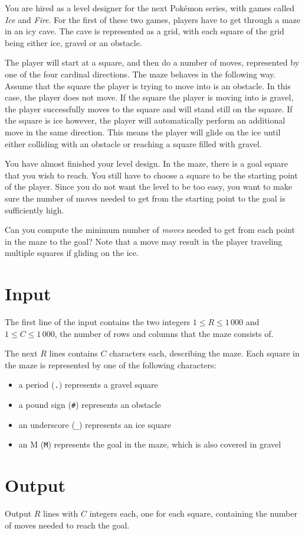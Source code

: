 You are hired as a level designer for the next Pokémon series, with games called \emph{Ice} and \emph{Fire}.
For the first of these two games, players have to get through a maze in an icy cave.
The cave is represented as a grid, with each square of the grid being either ice, gravel or an obstacle.

The player will start at a square, and then do a number of moves, represented by one of the four cardinal directions.
The maze behaves in the following way.
Assume that the square the player is trying to move into is an obstacle.
In this case, the player does not move.
If the square the player is moving into is gravel, the player successfully moves to the square and will stand still on the square.
If the square is ice however, the player will automatically perform an additional move in the same direction.
This means the player will glide on the ice until either colliding with an obstacle or reaching a square filled with gravel.

You have almost finished your level design.
In the maze, there is a goal square that you wish to reach.
You still have to choose a square to be the starting point of the player.
Since you do not want the level to be too easy, you want to make sure the number of moves needed to get from the starting point to the goal is sufficiently high.

Can you compute the minimum number of \emph{moves} needed to get from each point in the maze to the goal?
Note that a move may result in the player traveling multiple squares if gliding on the ice.

\section*{Input}
The first line of the input contains the two integers $1 \le R \le 1\,000$ and $1 \le C \le 1\,000$, the number of rows and columns that the maze consists of.

The next $R$ lines contains $C$ characters each, describing the maze.
Each square in the maze is represented by one of the following characters:
\begin{itemize}
\item a period (\texttt{.}) represents a gravel square
\item a pound sign (\texttt{\#}) represents an obstacle
\item an underscore (\texttt{\_}) represents an ice square
\item an M (\texttt{M}) represents the goal in the maze, which is also covered in gravel
\end{itemize}


\section*{Output}
Output $R$ lines with $C$ integers each, one for each square, containing the number of moves needed to reach the goal.
